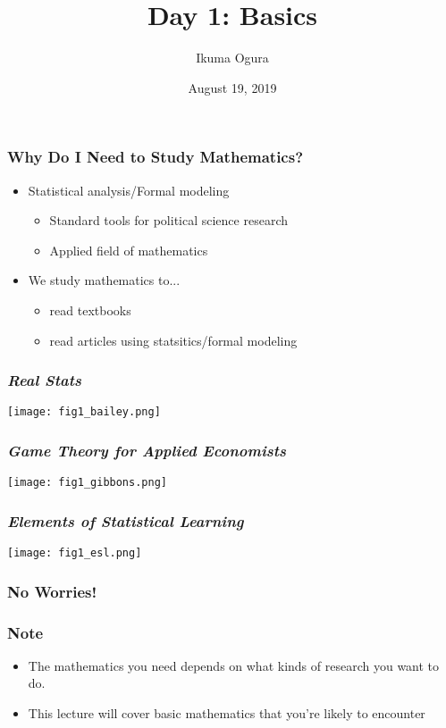 \documentclass[pdflatex, 12pt]{beamer}
\title[Math Camp]{Day 1: Basics}
\author[Ikuma Ogura]{Ikuma Ogura}
\institute[Georgetown]{Ph.D. student, Department of Government, Georgetown University}
\date[August 19, 2019]{August 19, 2019}
\begin{document}
\begin{frame}
\frametitle{}
\titlepage
\end{frame}

\begin{frame}
\frametitle{Why Do I Need to Study Mathematics?}
\begin{itemize}
\item Statistical analysis/Formal modeling
 \begin{itemize}
 \item Standard tools for political science research
 \item Applied field of mathematics
 \end{itemize}
\vspace{0.4cm}
\item We study mathematics to...
 \begin{itemize}
 \item read textbooks
 \item read articles using statsitics/formal modeling
 \end{itemize}
\end{itemize}
\end{frame}

\begin{frame}
\frametitle{\emph{Real Stats}}
\centering
\texttt{[image: fig1\_bailey.png]}
\end{frame}

\begin{frame}
\frametitle{\emph{Game Theory for Applied Economists}}
\centering
\texttt{[image: fig1\_gibbons.png]}
\end{frame}

\begin{frame}
\frametitle{\emph{Elements of Statistical Learning}}
\centering
\texttt{[image: fig1\_esl.png]}
\end{frame}

\begin{frame}
\frametitle{No Worries!}
\centering
{}
\end{frame}

\begin{frame}
\frametitle{Note}
\begin{itemize}
\item The mathematics you need depends on what kinds of research you want to do.
\vspace{0.4cm}
\item This lecture will cover basic mathematics that you're likely to encounter
\end{itemize}
\end{frame}
\end{document}
